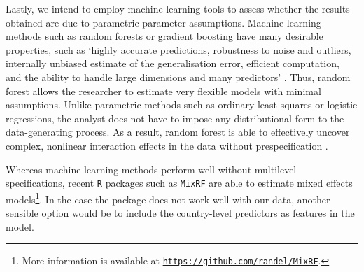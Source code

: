 \documentclass[a4paper,12pt]{article}
\begin{document}
Lastly, we intend to employ machine learning tools to assess whether the results obtained are due to parametric parameter assumptions. Machine learning methods such as random forests \citep{breiman2001random} or gradient boosting \citep{friedman2001greedy} have many desirable properties, such as `highly accurate predictions, robustness to noise and outliers, internally unbiased estimate of the generalisation error, efficient computation, and the ability to handle large dimensions and many predictors' \citep[7]{muchlinski2015comparing}. Thus, random forest allows the researcher to estimate very flexible models with minimal assumptions. Unlike parametric methods such as ordinary least squares or logistic regressions, the analyst does not have to impose any distributional form to the data-generating process. As a result, random forest is able to effectively uncover complex, nonlinear interaction effects in the data without prespecification \citep{jones2015exploratory}.

Whereas machine learning methods perform well without multilevel specifications, recent \texttt{R} packages such as \texttt{MixRF} are able to estimate mixed effects models\footnote{More information is available at \href{https://github.com/randel/MixRF}{\texttt{https://github.com/randel/MixRF}}.}. In the case the package does not work well with our data, another sensible option would be to include the country-level predictors as features in the model.

\newpage    


\end{document}
